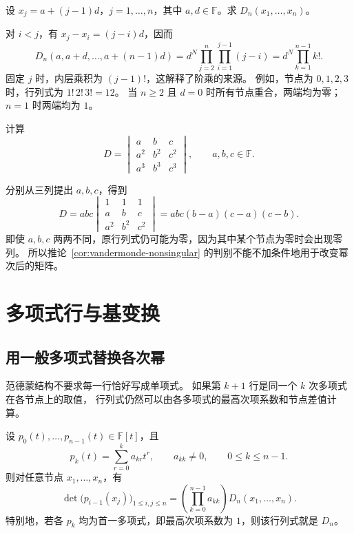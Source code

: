 \documentclass[UTF8,12pt,a4paper,fontset=fandol]{ctexart}
\begin{document}
\begin{example}[等差节点]
\label{ex:arithmetic-nodes}
设 $x_j=a+(j-1)d$，$j=1,\ldots,n$，其中 $a,d\in\mathbb F$。求 $D_n(x_1,\ldots,x_n)$。
\end{example}

\begin{solve}
对 $i<j$，有 $x_j-x_i=(j-i)d$，因而
\begin{equation}
  D_n(a,a+d,\ldots,a+(n-1)d)
  =d^N\prod_{j=2}^n\prod_{i=1}^{j-1}(j-i)
  =d^N\prod_{k=1}^{n-1}k!.
  \label{eq:arithmetic-nodes}
\end{equation}
固定 $j$ 时，内层乘积为 $(j-1)!$，这解释了阶乘的来源。
例如，节点为 $0,1,2,3$ 时，行列式为 $1!\,2!\,3!=12$。
当 $n\geq2$ 且 $d=0$ 时所有节点重合，两端均为零；$n=1$ 时两端均为 $1$。
\end{solve}

\begin{example}[幂次整体提高]
计算
\[
  D=\begin{vmatrix}
    a&b&c\\a^2&b^2&c^2\\a^3&b^3&c^3
  \end{vmatrix},\qquad a,b,c\in\mathbb F.
\]
\end{example}

\begin{solve}
分别从三列提出 $a,b,c$，得到
\[
  D=abc\begin{vmatrix}1&1&1\\a&b&c\\a^2&b^2&c^2\end{vmatrix}
   =abc(b-a)(c-a)(c-b).
\]
即使 $a,b,c$ 两两不同，原行列式仍可能为零，因为其中某个节点为零时会出现零列。
所以推论~\ref{cor:vandermonde-nonsingular} 的判别不能不加条件地用于改变幂次后的矩阵。
\end{solve}

\section{多项式行与基变换}

\subsection{用一般多项式替换各次幂}

范德蒙结构不要求每一行恰好写成单项式。
如果第 $k+1$ 行是同一个 $k$ 次多项式在各节点上的取值，
行列式仍然可以由各多项式的最高次项系数和节点差值计算。

\begin{theorem}[逐次多项式的取值行列式]
\label{thm:polynomial-basis}
设 $p_0(t),\ldots,p_{n-1}(t)\in\mathbb F[t]$，且
\[
  p_k(t)=\sum_{r=0}^k a_{kr}t^r,\qquad a_{kk}\ne0,\qquad 0\leq k\leq n-1.
\]
则对任意节点 $x_1,\ldots,x_n$，有
\begin{equation}
  \det\bigl(p_{i-1}(x_j)\bigr)_{1\leq i,j\leq n}
  =\left(\prod_{k=0}^{n-1}a_{kk}\right)D_n(x_1,\ldots,x_n).
  \label{eq:polynomial-basis}
\end{equation}
特别地，若各 $p_k$ 均为首一多项式，即最高次项系数为 $1$，则该行列式就是 $D_n$。
\end{theorem}
\end{document}
